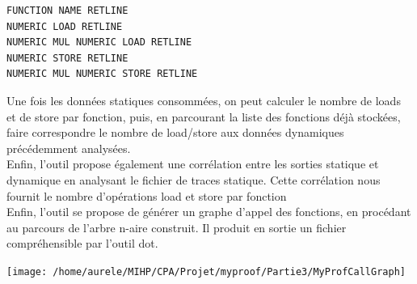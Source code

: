 \documentclass[oneside,11pt]{article}
\begin{document}
\begin{verbatim}
FUNCTION NAME RETLINE
NUMERIC LOAD RETLINE
NUMERIC MUL NUMERIC LOAD RETLINE
NUMERIC STORE RETLINE
NUMERIC MUL NUMERIC STORE RETLINE
\end{verbatim}

Une fois les données statiques consommées, on peut calculer le nombre de loads et de store par fonction, puis, en parcourant la liste des fonctions déjà stockées, faire correspondre le nombre de load/store aux données dynamiques précédemment analysées.\\

Enfin, l'outil propose également une corrélation entre les sorties statique et dynamique en analysant le fichier de traces statique. Cette corrélation nous fournit le nombre d'opérations load et store par fonction\\

Enfin, l'outil se propose de générer un graphe d'appel des fonctions, en procédant au parcours de l'arbre n-aire construit. Il produit en sortie un fichier compréhensible par l'outil dot. 

\begin{center}
	\texttt{[image: /home/aurele/MIHP/CPA/Projet/myproof/Partie3/MyProfCallGraph]}
\end{center}
\end{document}
